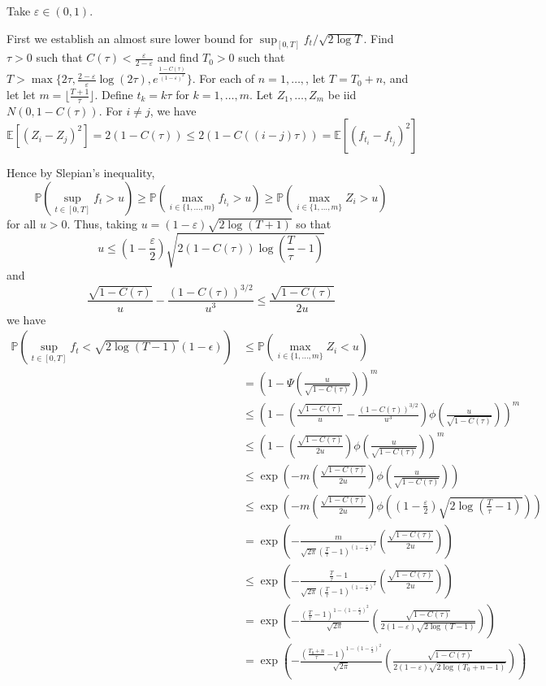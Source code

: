 \documentclass[11pt]{article}
\begin{document}
Take $\varepsilon \in (0,1)$.

First we establish an almost sure lower bound for $\sup_{[0,T]}f_t / \sqrt{2\log T}$.
Find $\tau > 0$ such that $C(\tau) <
\frac{\varepsilon}{2-\varepsilon}$ and find $T_0 > 0$ such that $T > \max\{ 2\tau,\frac{2-\varepsilon}{\varepsilon} \log(2\tau), e^{\frac{1-C(\tau)}{(1-\varepsilon)^2}}\}$.  For each of $n =
1,\hdots,$, let $T = T_0 + n$, and let let $m = \lfloor
\frac{T+1}{\tau} \rfloor$.  Define $t_k = k\tau$ for $k = 1,\hdots,m$.
Let $Z_1,\hdots, Z_m$ be iid $N(0,1-C(\tau))$.  For $i \neq j$, we have
\[
\mathbb{E}[(Z_i - Z_j)^2] = 2(1-C(\tau)) \leq 2(1-C((i-j)\tau)) = \mathbb{E}[(f_{t_i}-f_{t_j})^2]
\]

Hence by Slepian's inequality,
\[
\mathbb{P}(\sup_{t \in [0,T]} f_t > u) \geq
\mathbb{P}(\max_{i \in \{1,\hdots,m\}} f_{t_i} > u) \geq
\mathbb{P}(\max_{i \in \{1,\hdots,m\}} Z_i > u)\]
for all $u > 0$.
Thus, taking $u = (1-\varepsilon)\sqrt{2\log(T+1)}$
so that
\[
u \leq 
\left(1-\frac{\varepsilon}{2}\right) \sqrt{2(1-C(\tau)) \log\left(\frac{T}{\tau}-1\right)}
\]
and
\[
\frac{\sqrt{1-C(\tau)}}{u} - \frac{(1-C(\tau))^{3/2}}{u^3} \leq \frac{\sqrt{1-C(\tau)}}{2u}
\]
we have
\begin{align}
\mathbb{P}(\sup_{t \in [0,T]} f_t < \sqrt{2\log (T-1)}(1-\epsilon))
&\leq \mathbb{P}(\max_{i \in \{1,\hdots,m\}} Z_i < u)
\\&= \left(1-\Psi\left(\frac{u}{\sqrt{1-C(\tau)}}\right)\right)^m
\\&\leq \left(1-\left(\frac{\sqrt{1-C(\tau)}}{u} - \frac{(1-C(\tau))^{3/2}}{u^3}\right)\phi\left(\frac{u}{\sqrt{1-C(\tau)}}\right)\right)^m
\\&\leq \left(1-\left(\frac{\sqrt{1-C(\tau)}}{2u}\right)\phi\left(\frac{u}{\sqrt{1-C(\tau)}}\right)\right)^m
\\& \leq \exp\left(-m\left(\frac{\sqrt{1-C(\tau)}}{2u}\right)\phi\left(\frac{u}{\sqrt{1-C(\tau)}}\right)\right) 
\\& \leq \exp\left(-m\left(\frac{\sqrt{1-C(\tau)}}{2u}\right)\phi\left(\left(1-\frac{\varepsilon}{2}\right)\sqrt{2 \log\left(\frac{T}{\tau}-1\right)}\right)\right) 
\\& = \exp\left(-\frac{m}{\sqrt{2\pi}\left(\frac{T}{\tau}-1\right)^{(1-\frac{\varepsilon}{2})^2}}\left(\frac{\sqrt{1-C(\tau)}}{2u}\right)\right)
\\& \leq \exp\left(-\frac{\frac{T}{\tau}-1}{\sqrt{2\pi}\left(\frac{T}{\tau}-1\right)^{(1-\frac{\varepsilon}{2})^2}}\left(\frac{\sqrt{1-C(\tau)}}{2u}\right)\right)
\\& = \exp\left(-\frac{\left(\frac{T}{\tau}-1\right)^{1-(1-\frac{\varepsilon}{2})^2}}{\sqrt{2\pi}}\left(\frac{\sqrt{1-C(\tau)}}{2(1-\varepsilon)\sqrt{2\log(T-1)}}\right)\right)
\\& = \exp\left(-\frac{\left(\frac{T_0 + n}{\tau}-1\right)^{1-(1-\frac{\varepsilon}{2})^2}}{\sqrt{2\pi}}\left(\frac{\sqrt{1-C(\tau)}}{2(1-\varepsilon)\sqrt{2\log(T_0+n-1)}}\right)\right)
\end{align}
\end{document}
